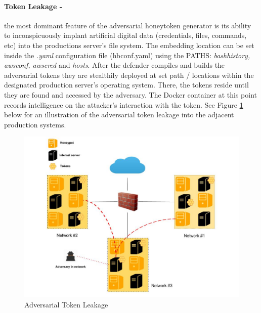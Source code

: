 \documentclass[grad,lot,lof,11pt,oneside,onehalfspace]{RUthesis}
\begin{document}
\paragraph{Token Leakage -} the most dominant feature of the adversarial honeytoken generator is its ability to inconspicuously implant artificial digital data (credentials, files, commands, etc) into the productions server's file system. The embedding location can be set inside the \textit{.yaml} configuration file (hbconf.yaml) using the PATHS: \textit{bashhistory, awsconf, awscred} and \textit{hosts}. After the defender compiles and builds the adversarial tokens they are stealthily deployed at set path / locations within the designated production server's operating system. There, the tokens reside until they are found and accessed by the adversary. The Docker container at this point records intelligence on the attacker's interaction with the token. See Figure \ref{fig:AdversarialTokensLeak} below for an illustration of the adversarial token leakage into the adjacent production systems. 

\begin{figure}[h]
\centering
\includegraphics[width=0.7\linewidth]{"Images/Chapter 5/AdversarialTokensLeak"}
\caption{Adversarial Token Leakage}
\label{fig:AdversarialTokensLeak}
\end{figure}
\end{document}
